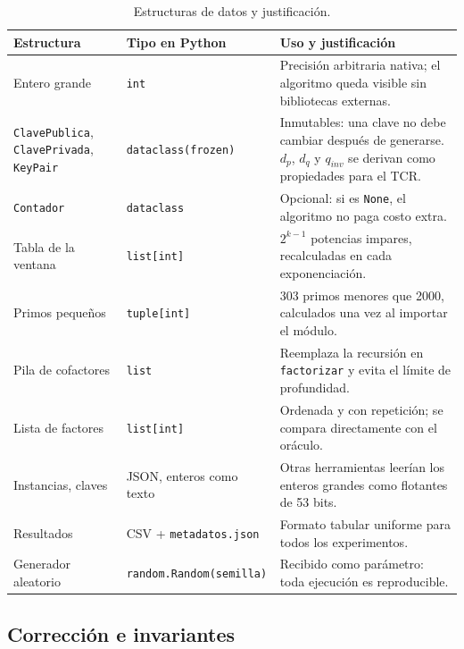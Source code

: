 \begin{table}[H]
\centering\small
\caption{Estructuras de datos y justificación.}
\label{tab:estructuras}
\begin{tabularx}{\textwidth}{@{}l l Y@{}}
\toprule
\textbf{Estructura} & \textbf{Tipo en Python} & \textbf{Uso y justificación}\\
\midrule
Entero grande & \texttt{int} & Precisión arbitraria nativa; el algoritmo queda visible sin bibliotecas externas.\\
\texttt{ClavePublica}, \texttt{ClavePrivada}, \texttt{KeyPair} & \texttt{dataclass(frozen)} & Inmutables: una clave no debe cambiar después de generarse. $d_p$, $d_q$ y $q_{inv}$ se derivan como propiedades para el TCR.\\
\texttt{Contador} & \texttt{dataclass} & Opcional: si es \texttt{None}, el algoritmo no paga costo extra.\\
Tabla de la ventana & \texttt{list[int]} & $2^{k-1}$ potencias impares, recalculadas en cada exponenciación.\\
Primos pequeños & \texttt{tuple[int]} & 303 primos menores que 2000, calculados una vez al importar el módulo.\\
Pila de cofactores & \texttt{list} & Reemplaza la recursión en \texttt{factorizar} y evita el límite de profundidad.\\
Lista de factores & \texttt{list[int]} & Ordenada y con repetición; se compara directamente con el oráculo.\\
Instancias, claves & JSON, enteros como texto & Otras herramientas leerían los enteros grandes como flotantes de 53 bits.\\
Resultados & CSV + \texttt{metadatos.json} & Formato tabular uniforme para todos los experimentos.\\
Generador aleatorio & \texttt{random.Random(semilla)} & Recibido como parámetro: toda ejecución es reproducible.\\
\bottomrule
\end{tabularx}
\end{table}

\subsection{Corrección e invariantes}

